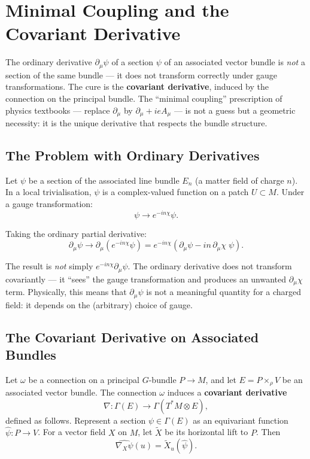 \chapter{Minimal Coupling and the Covariant Derivative}

The ordinary derivative $\partial_\mu\psi$ of a section $\psi$ of an associated vector bundle is \emph{not} a section of the same bundle --- it does not transform correctly under gauge transformations. The cure is the \textbf{covariant derivative}, induced by the connection on the principal bundle. The ``minimal coupling'' prescription of physics textbooks --- replace $\partial_\mu$ by $\partial_\mu + ieA_\mu$ --- is not a guess but a geometric necessity: it is the unique derivative that respects the bundle structure.

\section{The Problem with Ordinary Derivatives}

Let $\psi$ be a section of the associated line bundle $E_n$ (a matter field of charge $n$). In a local trivialisation, $\psi$ is a complex-valued function on a patch $U \subset M$. Under a gauge transformation:
\begin{equation}
\psi \to e^{-in\chi}\psi.
\end{equation}

Taking the ordinary partial derivative:
\begin{equation}
\partial_\mu\psi \to \partial_\mu(e^{-in\chi}\psi) = e^{-in\chi}(\partial_\mu\psi - in\,\partial_\mu\chi\;\psi).
\end{equation}

The result is \emph{not} simply $e^{-in\chi}\partial_\mu\psi$. The ordinary derivative does not transform covariantly --- it ``sees'' the gauge transformation and produces an unwanted $\partial_\mu\chi$ term. Physically, this means that $\partial_\mu\psi$ is not a meaningful quantity for a charged field: it depends on the (arbitrary) choice of gauge.

\section{The Covariant Derivative on Associated Bundles}

\begin{definition}
Let $\omega$ be a connection on a principal $G$-bundle $P \to M$, and let $E = P \times_\rho V$ be an associated vector bundle. The connection $\omega$ induces a \textbf{covariant derivative}
\begin{equation}
\nabla: \Gamma(E) \to \Gamma(T^*M \otimes E),
\end{equation}
defined as follows. Represent a section $\psi \in \Gamma(E)$ as an equivariant function $\hat{\psi}: P \to V$. For a vector field $X$ on $M$, let $\tilde{X}$ be its horizontal lift to $P$. Then
\begin{equation}
\widehat{\nabla_X\psi}(u) = \tilde{X}_u(\hat{\psi}).
\end{equation}
\end{definition}

